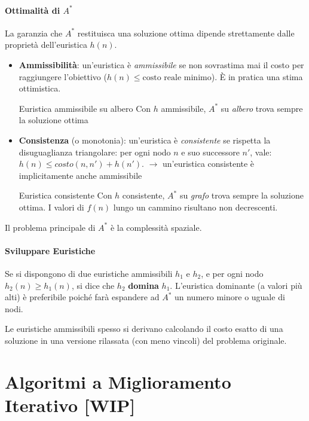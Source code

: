 \documentclass[a4paper,11pt]{report}
\begin{document}
\subsubsection{Ottimalità di $A^*$}
La garanzia che $A^*$ restituisca una soluzione ottima dipende strettamente dalle proprietà dell'euristica $h(n)$.
\begin{itemize}
    \item \textbf{Ammissibilità}: un'euristica è \textit{ammissibile} se non sovrastima mai il costo per raggiungere l'obiettivo ($h(n) \le \text{costo reale minimo}$). È in pratica una stima ottimistica.
        \begin{thmframe}{Euristica ammissibile su albero}{}
            Con $h$ ammissibile, $A^*$ su \textit{albero} trova sempre la soluzione ottima
        \end{thmframe}
    \item \textbf{Consistenza} (o monotonia): un'euristica è \textit{consistente} se rispetta la disuguaglianza triangolare: per ogni nodo $n$ e suo successore $n'$, vale: $h(n) \le costo(n, n') + h(n')$.
        \subitem $\rightarrow$ un'euristica consistente è implicitamente anche ammissibile
        \begin{thmframe}{Euristica consistente}{}
Con $h$ consistente, $A^*$ su \textit{grafo} trova sempre la soluzione ottima. I valori di $f(n)$ lungo un cammino risultano non decrescenti.
        \end{thmframe}
\end{itemize}

Il problema principale di $A^*$ è la complessità spaziale.

\subsubsection{Sviluppare Euristiche}
Se si dispongono di due euristiche ammissibili $h_1$ e $h_2$, e per ogni nodo $h_2(n) \ge h_1(n)$, si dice che $h_2$ \textbf{domina} $h_1$. L'euristica dominante (a valori più alti) è preferibile poiché farà espandere ad $A^*$ un numero minore o uguale di nodi.

Le euristiche ammissibili spesso si derivano calcolando il costo esatto di una soluzione in una versione rilassata (con meno vincoli) del problema originale.

\chapter{Algoritmi a Miglioramento Iterativo [WIP]}
\vspace{-2em}
\end{document}
